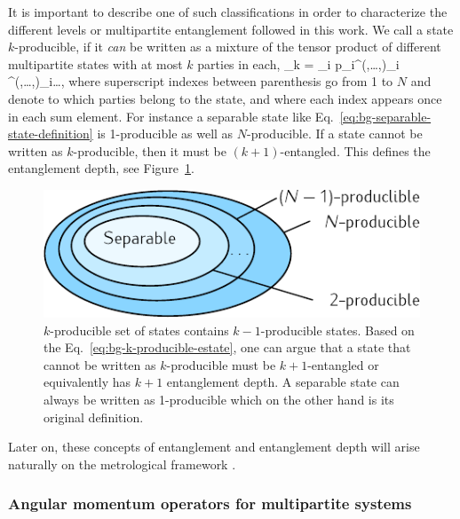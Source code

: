 It is important to describe one of such classifications in order to characterize the different levels or multipartite entanglement followed in this work.
We call a state $k$-producible, if it \emph{can} be written as a mixture of the tensor product of different multipartite states with at most $k$ parties in each,
\be
  \label{eq:bg-k-producible-estate}
  \rho_{k} = \sum_i p_i\rho^{(\alpha,\dots,\beta)}_i \otimes \rho^{(\gamma,\dots,\delta)}_i\otimes \dots,
\ee
where superscript indexes between parenthesis go from 1 to $N$ and denote to which parties belong to the state, and where each index appears once in each sum element.
For instance a separable state like Eq.~\eqref{eq:bg-separable-state-definition} is 1-producible as well as $N$-producible.
If a state cannot be written as $k$-producible, then it must be $(k+1)$-entangled.
This defines the entanglement depth, see Figure~\ref{fig:bg-separability-k-producibility-circle}.
\begin{figure}[htp]
  \centering
  \includegraphics[scale=1.2]{img/BG_separability_k_producibility_circle.pdf}
  \caption[Diagram for $k$-producibility sets]{$k$-producible set of states contains $k-1$-producible states. Based on the Eq.~\eqref{eq:bg-k-producible-estate}, one can argue that a state that cannot be written as $k$-producible must be $k+1$-entangled or equivalently has $k+1$ entanglement depth. A separable state can always be written as 1-producible which on the other hand is its original definition.}
  \label{fig:bg-separability-k-producibility-circle}
\end{figure}
Later on, these concepts of entanglement and entanglement depth will arise naturally on the metrological framework \cite{Toth2014}.

\subsubsection{Angular momentum operators for multipartite systems}
\label{sec:bg-angular-momentum-operators}

